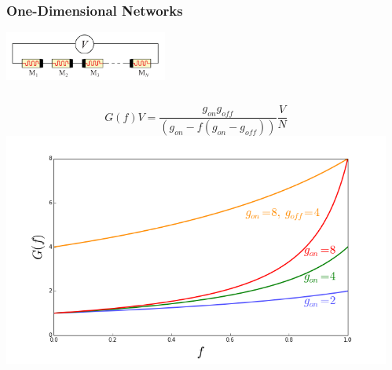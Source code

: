 \documentclass[mathserif]{beamer}
\begin{document}
\begin{frame}
\frametitle{One-Dimensional Networks}
\centering
\includegraphics[width=0.4\textwidth]{1D_memristor_chain.png}

\begin{columns}
$$G(f)V = \frac{g_{on}g_{off}}{(g_{on} - f (g_{on} - g_{off}))}\frac{V}{N}$$
\centering
\includegraphics[width=\textwidth]{1D_Network_Cond.png}

\begin{center}



\end{center}
\end{columns}
\end{frame}
\end{document}
